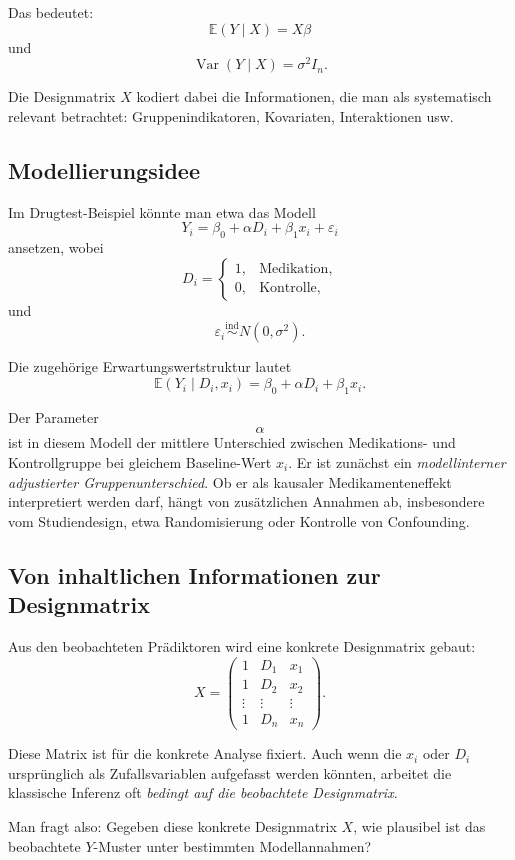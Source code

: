 \documentclass[10pt, letterpaper]{article}
\begin{document}
Das bedeutet:
\[
\mathbb E(Y\mid X)=X\beta
\]
und
\[
\operatorname{Var}(Y\mid X)=\sigma^2I_n.
\]

Die Designmatrix \(X\) kodiert dabei die Informationen, die man als systematisch relevant betrachtet: Gruppenindikatoren, Kovariaten, Interaktionen usw.

\subsection{Modellierungsidee}

Im Drugtest-Beispiel könnte man etwa das Modell
\[
Y_i=\beta_0+\alpha D_i+\beta_1x_i+\varepsilon_i
\]
ansetzen, wobei
\[
D_i=
\begin{cases}
1, & \text{Medikation},\\
0, & \text{Kontrolle},
\end{cases}
\]
und
\[
\varepsilon_i\overset{\mathrm{ind}}{\sim}N(0,\sigma^2).
\]

Die zugehörige Erwartungswertstruktur lautet
\[
\mathbb E(Y_i\mid D_i,x_i)
=
\beta_0+\alpha D_i+\beta_1x_i.
\]

Der Parameter
\[
\alpha
\]
ist in diesem Modell der mittlere Unterschied zwischen Medikations- und Kontrollgruppe bei gleichem Baseline-Wert \(x_i\). Er ist zunächst ein \emph{modellinterner adjustierter Gruppenunterschied}. Ob er als kausaler Medikamenteneffekt interpretiert werden darf, hängt von zusätzlichen Annahmen ab, insbesondere vom Studiendesign, etwa Randomisierung oder Kontrolle von Confounding.

\subsection{Von inhaltlichen Informationen zur Designmatrix}

Aus den beobachteten Prädiktoren wird eine konkrete Designmatrix gebaut:
\[
X=
\begin{pmatrix}
1 & D_1 & x_1\\
1 & D_2 & x_2\\
\vdots & \vdots & \vdots\\
1 & D_n & x_n
\end{pmatrix}.
\]

Diese Matrix ist für die konkrete Analyse fixiert. Auch wenn die \(x_i\) oder \(D_i\) ursprünglich als Zufallsvariablen aufgefasst werden könnten, arbeitet die klassische Inferenz oft \emph{bedingt auf die beobachtete Designmatrix}.

Man fragt also:
Gegeben diese konkrete Designmatrix $X$, wie plausibel ist das beobachtete $Y$-Muster unter bestimmten Modellannahmen?
\end{document}
